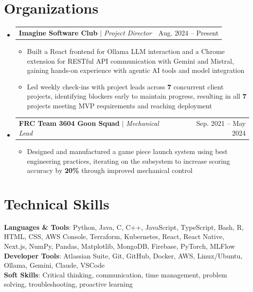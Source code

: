 \documentclass[letterpaper,11pt]{article}
\makeatletter
\newcommand{\resumeItem}[1]{
  \item\small{
    {#1 \vspace{-4pt}}
  }
}
\newcommand{\resumeProjectHeading}[2]{
    \item
    \begin{tabular*}{0.97\textwidth}{l@{\extracolsep{\fill}}r}
      \small#1 & #2 \\
    \end{tabular*}\vspace{-7pt}
}
\newcommand{\resumeSubHeadingListStart}{\begin{itemize}[leftmargin=0.15in, label={}]}
\newcommand{\resumeSubHeadingListEnd}{\end{itemize}}
\newcommand{\resumeItemListStart}{\begin{itemize}}
\newcommand{\resumeItemListEnd}{\end{itemize}\vspace{-5pt}}
\makeatother
\begin{document}
\section{Organizations}
  \resumeSubHeadingListStart
  
    \resumeProjectHeading
      {\textbf{Imagine Software Club} $|$ \emph{Project Director}}{Aug. 2024 -- Present}
      \resumeItemListStart
        \resumeItem{Built a React frontend for Ollama LLM interaction and a Chrome extension for RESTful API communication with Gemini and Mistral, gaining hands-on experience with agentic AI tools and model integration}
        \resumeItem{Led weekly check-ins with project leads across \textbf{7} concurrent client projects, identifying blockers early to maintain progress, resulting in all \textbf{7} projects meeting MVP requirements and reaching deployment}
      \resumeItemListEnd

    \resumeProjectHeading
      {\textbf{FRC Team 3604 Goon Squad} $|$ \emph{Mechanical Lead}}{Sep. 2021 -- May 2024}
      \resumeItemListStart
        \resumeItem{Designed and manufactured a game piece launch system using best engineering practices, iterating on the subsystem to increase scoring accuracy by \textbf{20\%} through improved mechanical control}
      \resumeItemListEnd

 \resumeSubHeadingListEnd
 
%
\section{Technical Skills}
 \begin{itemize}[leftmargin=0.15in, label={}]
    \small{\item{
     \textbf{Languages \& Tools}{: Python, Java, C, C++, JavaScript, TypeScript, Bash, R, HTML, CSS, AWS Console, Terraform, Kubernetes, React, React Native, Next.js, NumPy, Pandas, Matplotlib, MongoDB, Firebase, PyTorch, MLFlow} \\
     \textbf{Developer Tools}{: Atlassian Suite, Git, GitHub, Docker, AWS, Linux/Ubuntu, Ollama, Gemini, Claude, VSCode} \\
     \textbf{Soft Skills}{: Critical thinking, communication, time management, problem solving, troubleshooting, proactive learning} \\
    }}
 \end{itemize}


\end{document}
